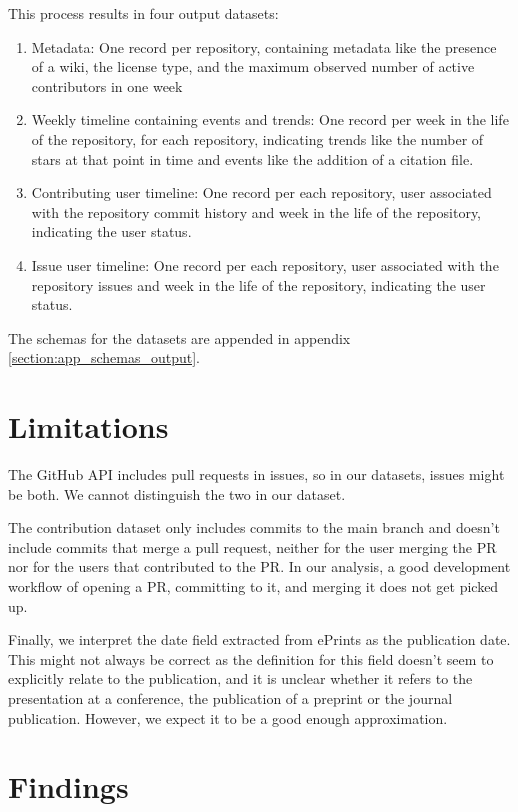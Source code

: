 \documentclass[10pt,a4paper]{scrartcl}
\begin{document}
This process results in four output datasets:
\begin{enumerate}
    \item Metadata: One record per repository, containing metadata like the presence of a wiki, the license type, and the maximum observed number of active contributors in one week
    \item Weekly timeline containing events and trends: One record per week in the life of the repository, for each repository, indicating trends like the number of stars at that point in time and events like the addition of a citation file.
    \item Contributing user timeline: One record per each repository, user associated with the repository commit history and week in the life of the repository, indicating the user status.
    \item Issue user timeline: One record per each repository, user associated with the repository issues and week in the life of the repository, indicating the user status.
\end{enumerate}

The schemas for the datasets are appended in appendix \ref{section:app_schemas_output}.

\section{Limitations}
\label{section:limits}

The GitHub API includes pull requests in issues, so in our datasets, issues might be both.
We cannot distinguish the two in our dataset.

The contribution dataset only includes commits to the main branch and doesn't include commits that merge a pull request, neither for the user merging the PR nor for the users that contributed to the PR.
In our analysis, a good development workflow of opening a PR, committing to it, and merging it does not get picked up.

Finally, we interpret the date field extracted from ePrints as the publication date.
This might not always be correct as the definition for this field doesn't seem to explicitly relate to the publication,
and it is unclear whether it refers to the presentation at a conference, the publication of a preprint or the journal publication.
However, we expect it to be a good enough approximation. 

\section{Findings}
\end{document}
